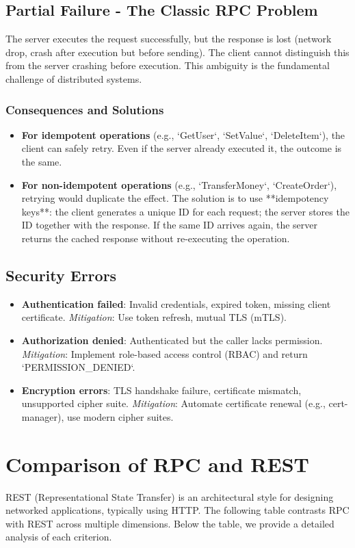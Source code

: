 \documentclass[a4paper]{article}
\begin{document}
\subsection{Partial Failure - The Classic RPC Problem}
The server executes the request successfully, but the response is lost (network drop, crash after execution but before sending). The client cannot distinguish this from the server crashing before execution. This ambiguity is the fundamental challenge of distributed systems.

\subsubsection{Consequences and Solutions}
\begin{itemize}
    \item \textbf{For idempotent operations} (e.g., `GetUser`, `SetValue`, `DeleteItem`), the client can safely retry. Even if the server already executed it, the outcome is the same.
    \item \textbf{For non-idempotent operations} (e.g., `TransferMoney`, `CreateOrder`), retrying would duplicate the effect. The solution is to use **idempotency keys**: the client generates a unique ID for each request; the server stores the ID together with the response. If the same ID arrives again, the server returns the cached response without re-executing the operation.
\end{itemize}

\subsection{Security Errors}
\begin{itemize}
    \item \textbf{Authentication failed}: Invalid credentials, expired token, missing client certificate.  
        \textit{Mitigation}: Use token refresh, mutual TLS (mTLS).
    \item \textbf{Authorization denied}: Authenticated but the caller lacks permission.  
        \textit{Mitigation}: Implement role-based access control (RBAC) and return `PERMISSION\_DENIED`.
    \item \textbf{Encryption errors}: TLS handshake failure, certificate mismatch, unsupported cipher suite.  
        \textit{Mitigation}: Automate certificate renewal (e.g., cert-manager), use modern cipher suites.
\end{itemize}

\section{Comparison of RPC and REST}
REST (Representational State Transfer) is an architectural style for designing networked applications, typically using HTTP. The following table contrasts RPC with REST across multiple dimensions. Below the table, we provide a detailed analysis of each criterion.
\end{document}
